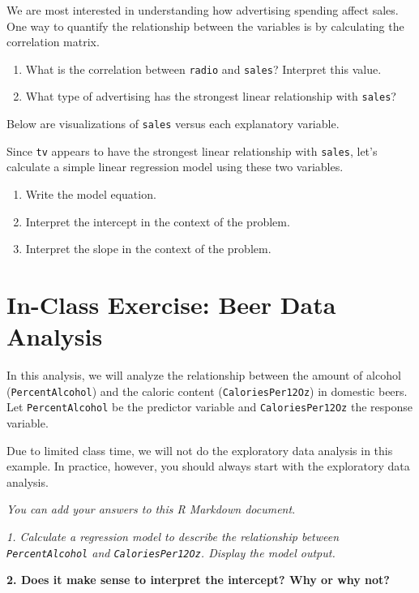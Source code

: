 \documentclass[]{book}
\begin{document}
We are most interested in understanding how advertising spending affect
sales. One way to quantify the relationship between the variables is by
calculating the correlation matrix.

\begin{enumerate}
\def\labelenumi{\arabic{enumi}.}
\item
  What is the correlation between \texttt{radio} and \texttt{sales}?
  Interpret this value.
\item
  What type of advertising has the strongest linear relationship with
  \texttt{sales}?
\end{enumerate}

Below are visualizations of \texttt{sales} versus each explanatory
variable.

Since \texttt{tv} appears to have the strongest linear relationship with
\texttt{sales}, let's calculate a simple linear regression model using
these two variables.

\begin{enumerate}
\def\labelenumi{\arabic{enumi}.}
\item
  Write the model equation.
\item
  Interpret the intercept in the context of the problem.
\item
  Interpret the slope in the context of the problem.
\end{enumerate}

\section{In-Class Exercise: Beer Data
Analysis}\label{in-class-exercise-beer-data-analysis}

In this analysis, we will analyze the relationship between the amount of
alcohol (\texttt{PercentAlcohol}) and the caloric content
(\texttt{CaloriesPer12Oz}) in domestic beers. Let
\texttt{PercentAlcohol} be the predictor variable and
\texttt{CaloriesPer12Oz} the response variable.

Due to limited class time, we will not do the exploratory data analysis
in this example. In practice, however, you should always start with the
exploratory data analysis.

\emph{You can add your answers to this R Markdown document}.

\emph{1. Calculate a regression model to describe the relationship
between \texttt{PercentAlcohol} and \texttt{CaloriesPer12Oz}. Display
the model output.}

\textbf{2. Does it make sense to interpret the intercept? Why or why
not?}
\end{document}
